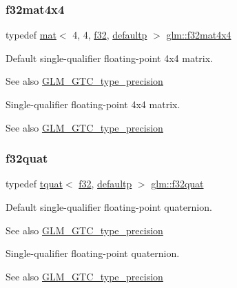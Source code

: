 \subsubsection{\texorpdfstring{f32mat4x4}{f32mat4x4}}
{\footnotesize\ttfamily typedef \hyperlink{structglm_1_1mat}{mat}$<$ 4, 4, \hyperlink{group__gtc__type__precision_ga0ec999b57f5330d9021256e96038df04}{f32}, \hyperlink{namespaceglm_a36ed105b07c7746804d7fdc7cc90ff25a9d21ccd8b5a009ec7eb7677befc3bf51}{defaultp} $>$ \hyperlink{group__gtc__type__precision_ga2ba95a5c37eef05b26ac10e03daa5c84}{glm\+::f32mat4x4}}

Default single-\/qualifier floating-\/point 4x4 matrix. \begin{DoxySeeAlso}{See also}
\hyperlink{group__gtc__type__precision}{G\+L\+M\+\_\+\+G\+T\+C\+\_\+type\+\_\+precision}
\end{DoxySeeAlso}
Single-\/qualifier floating-\/point 4x4 matrix. \begin{DoxySeeAlso}{See also}
\hyperlink{group__gtc__type__precision}{G\+L\+M\+\_\+\+G\+T\+C\+\_\+type\+\_\+precision} 
\end{DoxySeeAlso}
\mbox{\label{group__gtc__type__precision_gac59c4d798396552e4bbb866b3d8a2f18}} 
\subsubsection{\texorpdfstring{f32quat}{f32quat}}
{\footnotesize\ttfamily typedef \hyperlink{structglm_1_1tquat}{tquat}$<$ \hyperlink{group__gtc__type__precision_ga0ec999b57f5330d9021256e96038df04}{f32}, \hyperlink{namespaceglm_a36ed105b07c7746804d7fdc7cc90ff25a9d21ccd8b5a009ec7eb7677befc3bf51}{defaultp} $>$ \hyperlink{group__gtc__type__precision_gac59c4d798396552e4bbb866b3d8a2f18}{glm\+::f32quat}}

Default single-\/qualifier floating-\/point quaternion. \begin{DoxySeeAlso}{See also}
\hyperlink{group__gtc__type__precision}{G\+L\+M\+\_\+\+G\+T\+C\+\_\+type\+\_\+precision}
\end{DoxySeeAlso}
Single-\/qualifier floating-\/point quaternion. \begin{DoxySeeAlso}{See also}
\hyperlink{group__gtc__type__precision}{G\+L\+M\+\_\+\+G\+T\+C\+\_\+type\+\_\+precision} 
\end{DoxySeeAlso}
\mbox{\label{group__gtc__type__precision_ga27d40e360fd5b6ad39ca34ded8210b53}} 
